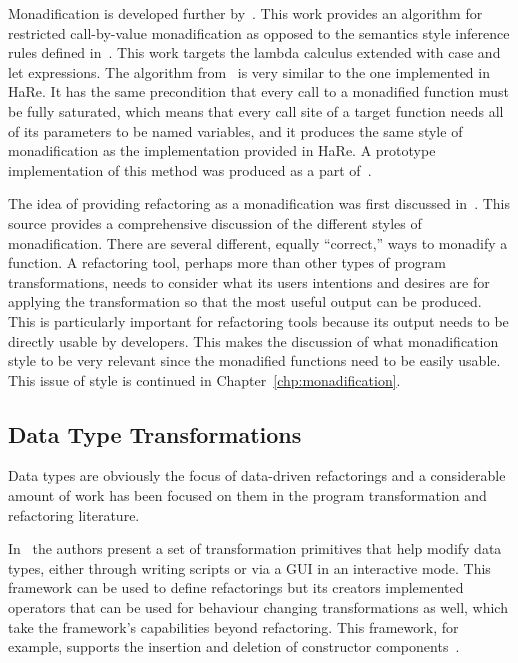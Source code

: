 Monadification is developed further by~\citep{monadification}. This work provides an algorithm for restricted call-by-value monadification as opposed to the semantics style inference rules defined in~\citep{lammelReuse}. This work targets the lambda calculus extended with case and let expressions. The algorithm from~\citep{monadification} is very similar to the one implemented in HaRe. It has the same precondition that every call to a monadified function must be fully saturated, which means that every call site of a target function needs all of its parameters to be named variables, and it produces the same style of monadification as the implementation provided in HaRe. A prototype implementation of this method was produced as a part of~\citep{monadification}.

The idea of providing refactoring as a monadification was first discussed in~\cite{monadSurvey}. This source provides a comprehensive discussion of the different styles of monadification. There are several different, equally ``correct,'' ways to monadify a function. A refactoring tool, perhaps more than other types of program transformations, needs to consider what its users intentions and desires are for applying the transformation so that the most useful output can be produced. This is particularly important for refactoring tools because its output needs to be directly usable by developers. This makes the discussion of what monadification style to be very relevant since the monadified functions need to be easily usable. This issue of style is continued in Chapter~\ref{chp:monadification}. 

\subsection{Data Type Transformations}\label{dtt}

Data types are obviously the focus of data-driven refactorings and a considerable amount of work has been focused on them in the program transformation and refactoring literature. 

In~\cite{dataTypeTransformation} the authors present a set of transformation primitives that help modify data types, either through writing scripts or via a GUI in an interactive mode. This framework can be used to define refactorings but its creators implemented operators that can be used for behaviour changing transformations as well, which take the framework's capabilities beyond refactoring. This framework, for example, supports the insertion and deletion of constructor components~\citep{dataTypeTransformation}. 

